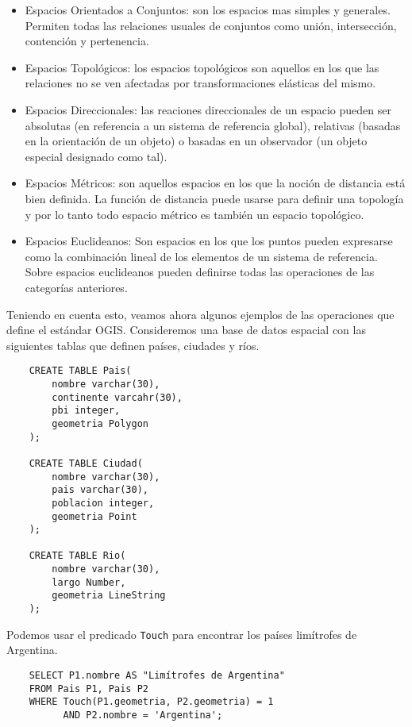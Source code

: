 \begin{itemize}
    \item Espacios Orientados a Conjuntos: son los espacios mas simples y generales.
    Permiten todas las relaciones usuales de conjuntos como unión, intersección, contención y pertenencia.
    \item Espacios Topológicos: los espacios topológicos son aquellos en los que las relaciones no se ven afectadas
    por transformaciones elásticas del mismo.
    \item Espacios Direccionales: las reaciones direccionales de un espacio pueden ser
    absolutas (en referencia a un sistema de referencia global),
    relativas (basadas en la orientación de un objeto)
    o basadas en un observador (un objeto especial designado como tal).
    \item Espacios Métricos: son aquellos espacios en los que la noción de distancia está bien definida. La función de distancia puede usarse
    para definir una topología y por lo tanto todo espacio métrico es también un espacio topológico.
    \item Espacios Euclideanos: Son espacios en los que los puntos pueden expresarse como la combinación lineal de los elementos de
    un sistema de referencia. Sobre espacios euclideanos pueden definirse todas las operaciones de las categorías anteriores.
\end{itemize}

Teniendo en cuenta esto, veamos ahora algunos ejemplos de las operaciones que define el estándar OGIS.
Consideremos una base de datos espacial con las siguientes tablas que definen países, ciudades y ríos.

\begin{verbatim}
    CREATE TABLE Pais(
        nombre varchar(30),
        continente varcahr(30),
        pbi integer,
        geometria Polygon
    );

    CREATE TABLE Ciudad(
        nombre varchar(30),
        pais varchar(30),
        poblacion integer,
        geometria Point
    );

    CREATE TABLE Rio(
        nombre varchar(30),
        largo Number,
        geometria LineString
    );
\end{verbatim}

Podemos usar el predicado \texttt{Touch} para encontrar los países limítrofes de Argentina.

\begin{verbatim}
    SELECT P1.nombre AS "Limítrofes de Argentina"
    FROM Pais P1, Pais P2
    WHERE Touch(P1.geometria, P2.geometria) = 1
          AND P2.nombre = 'Argentina';
\end{verbatim}

